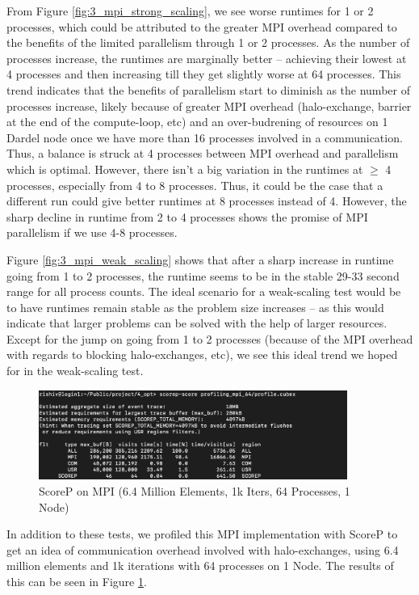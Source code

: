 \documentclass[a4paper,10pt]{article}
\begin{document}
From Figure \ref{fig:3_mpi_strong_scaling}, we see worse runtimes for 1 or 2 processes, which could be attributed to the greater MPI overhead compared to the benefits of the limited parallelism through 1 or 2 processes. As the number of processes increase, the runtimes are marginally better -- achieving their lowest at 4 processes and then increasing till they get slightly worse at 64 processes. This trend indicates that the benefits of parallelism start to diminish as the number of processes increase, likely because of greater MPI overhead (halo-exchange, barrier at the end of the compute-loop, etc) and an over-budrening of resources on 1 Dardel node once we have more than 16 processes involved in a communication. Thus, a balance is struck at 4 processes between MPI overhead and parallelism which is optimal. However, there isn't a big variation in the runtimes at $\geq$ 4 processes, especially from 4 to 8 processes. Thus, it could be the case that a different run could give better runtimes at 8 processes instead of 4. However, the sharp decline in runtime from 2 to 4 processes shows the promise of MPI parallelism if we use 4-8 processes. 

Figure \ref{fig:3_mpi_weak_scaling} shows that after a sharp increase in runtime going from 1 to 2 processes, the runtime seems to be in the stable 29-33 second range for all process counts. The ideal scenario for a weak-scaling test would be to have runtimes remain stable as the problem size increases -- as this would indicate that larger problems can be solved with the help of larger resources. Except for the jump on going from 1 to 2 processes (because of the MPI overhead with regards to blocking halo-exchanges, etc), we see this ideal trend we hoped for in the weak-scaling test. 

\begin{figure}[H]
  \centering
  \includegraphics[width=0.9\textwidth]{../images/4_opt/scorep_64_mpi.png}
  \caption{ScoreP on MPI (6.4 Million Elements, 1k Iters, 64 Processes, 1 Node)}
  \label{fig:3_mpi_scorep_64}
\end{figure}

In addition to these tests, we profiled this MPI implementation with ScoreP to get an idea of communication overhead involved with halo-exchanges, using 6.4 million elements and 1k iterations with 64 processes on 1 Node. The results of this can be seen in Figure \ref{fig:3_mpi_scorep_64}. 
\end{document}
